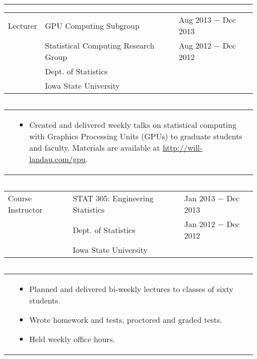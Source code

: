 \documentclass{article}
\newcommand{\q}{$\quad$ \newline}
\newcommand{\vl}{4.25}
\newcommand{\wl}{8.4}
\newcommand{\ww}{13}
\newcommand{\myrule}{\noindent \rule{\textwidth}{1pt}}
\begin{document}



\myrule
 
\noindent \begin{tabular}{@{}p{\vl cm}p{\wl cm}l@{}}
Lecturer & GPU Computing Subgroup & Aug 2013 $-$ Dec 2013 \\
& Statistical Computing Research Group & Aug 2012 $-$ Dec 2012 \\
& Dept. of Statistics & \\
& Iowa State University & 
\end{tabular} \q 
   
 \noindent \begin{tabular}{@{}p{\vl cm}p{\ww cm}@{}}
& \begin{itemize}
\item Created and delivered weekly talks on statistical computing with Graphics Processing Units (GPUs) to graduate students and faculty. Materials are available at \href{http://will-landau.com/gpu}{http://will-landau.com/gpu}.
\end{itemize}
\end{tabular} \q 


\noindent \begin{tabular}{@{}p{\vl cm}p{\wl cm}l@{}}
Course Instructor & STAT 305: Engineering Statistics & Jan 2013 $-$ Dec 2013 \\
& Dept. of Statistics & Jan 2012 $-$ Dec 2012 \\
& Iowa State University & \\
\end{tabular} \q 

\noindent \begin{tabular}{@{}p{\vl cm}p{\ww cm}@{}}
& \begin{itemize}
\item Planned and delivered bi-weekly lectures to classes of sixty students. 
\item Wrote homework and tests, proctored and graded tests. 
\item Held weekly office hours. 
\end{itemize}
\end{tabular} \q  
\end{document}
